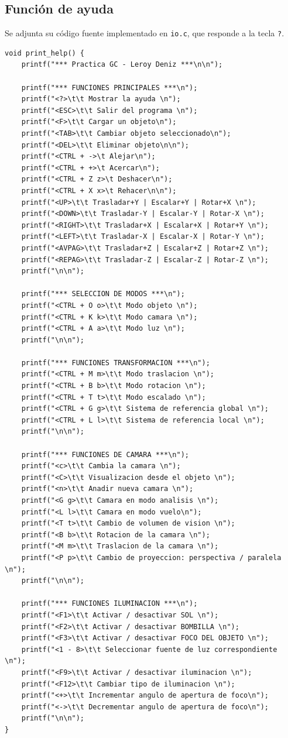 \documentclass[12pt,a4paper]{article}
\begin{document}
\subsection{Función de ayuda}

Se adjunta su código fuente implementado en \texttt{io.c}, que responde a la tecla \texttt{?}.
\vspace{0.5cm}

\begin{lstlisting}
void print_help() {
	printf("*** Practica GC - Leroy Deniz ***\n\n");

	printf("*** FUNCIONES PRINCIPALES ***\n");
	printf("<?>\t\t Mostrar la ayuda \n");
	printf("<ESC>\t\t Salir del programa \n");
	printf("<F>\t\t Cargar un objeto\n");
	printf("<TAB>\t\t Cambiar objeto seleccionado\n");
	printf("<DEL>\t\t Eliminar objeto\n\n");
	printf("<CTRL + ->\t Alejar\n");
	printf("<CTRL + +>\t Acercar\n");
	printf("<CTRL + Z z>\t Deshacer\n");
	printf("<CTRL + X x>\t Rehacer\n\n");
	printf("<UP>\t\t Trasladar+Y | Escalar+Y | Rotar+X \n");
	printf("<DOWN>\t\t Trasladar-Y | Escalar-Y | Rotar-X \n");
	printf("<RIGHT>\t\t Trasladar+X | Escalar+X | Rotar+Y \n");
	printf("<LEFT>\t\t Trasladar-X | Escalar-X | Rotar-Y \n");
	printf("<AVPAG>\t\t Trasladar+Z | Escalar+Z | Rotar+Z \n");
	printf("<REPAG>\t\t Trasladar-Z | Escalar-Z | Rotar-Z \n");
	printf("\n\n");

	printf("*** SELECCION DE MODOS ***\n");
	printf("<CTRL + O o>\t\t Modo objeto \n");
	printf("<CTRL + K k>\t\t Modo camara \n");
	printf("<CTRL + A a>\t\t Modo luz \n");
	printf("\n\n");

	printf("*** FUNCIONES TRANSFORMACION ***\n");
	printf("<CTRL + M m>\t\t Modo traslacion \n");
	printf("<CTRL + B b>\t\t Modo rotacion \n");
	printf("<CTRL + T t>\t\t Modo escalado \n");
	printf("<CTRL + G g>\t\t Sistema de referencia global \n");
	printf("<CTRL + L l>\t\t Sistema de referencia local \n");
	printf("\n\n");

	printf("*** FUNCIONES DE CAMARA ***\n");
	printf("<c>\t\t Cambia la camara \n");
	printf("<C>\t\t Visualizacion desde el objeto \n");
	printf("<n>\t\t Anadir nueva camara \n");
	printf("<G g>\t\t Camara en modo analisis \n");
	printf("<L l>\t\t Camara en modo vuelo\n");
	printf("<T t>\t\t Cambio de volumen de vision \n");
	printf("<B b>\t\t Rotacion de la camara \n");
	printf("<M m>\t\t Traslacion de la camara \n");
	printf("<P p>\t\t Cambio de proyeccion: perspectiva / paralela \n");
	printf("\n\n");

	printf("*** FUNCIONES ILUMINACION ***\n");
	printf("<F1>\t\t Activar / desactivar SOL \n");
	printf("<F2>\t\t Activar / desactivar BOMBILLA \n");
	printf("<F3>\t\t Activar / desactivar FOCO DEL OBJETO \n");
	printf("<1 - 8>\t\t Seleccionar fuente de luz correspondiente \n");
	printf("<F9>\t\t Activar / desactivar iluminacion \n");
	printf("<F12>\t\t Cambiar tipo de iluminacion \n");
	printf("<+>\t\t Incrementar angulo de apertura de foco\n");
	printf("<->\t\t Decrementar angulo de apertura de foco\n");
	printf("\n\n");
}

\end{lstlisting}
\end{document}
